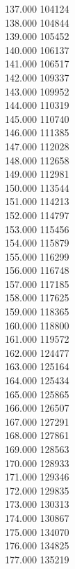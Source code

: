 { 137.000	104124 \\
 138.000	104844 \\
 139.000	105452 \\
 140.000	106137 \\
 141.000	106517 \\
 142.000	109337 \\
 143.000	109952 \\
 144.000	110319 \\
 145.000	110740 \\
 146.000	111385 \\
 147.000	112028 \\
 148.000	112658 \\
 149.000	112981 \\
 150.000	113544 \\
 151.000	114213 \\
 152.000	114797 \\
 153.000	115456 \\
 154.000	115879 \\
 155.000	116299 \\
 156.000	116748 \\
 157.000	117185 \\
 158.000	117625 \\
 159.000	118365 \\
 160.000	118800 \\
 161.000	119572 \\
 162.000	124477 \\
 163.000	125164 \\
 164.000	125434 \\
 165.000	125865 \\
 166.000	126507 \\
 167.000	127291 \\
 168.000	127861 \\
 169.000	128563 \\
 170.000	128933 \\
 171.000	129346 \\
 172.000	129835 \\
 173.000	130313 \\
 174.000	130867 \\
 175.000	134070 \\
 176.000	134825 \\
 177.000	135219 \\
}
